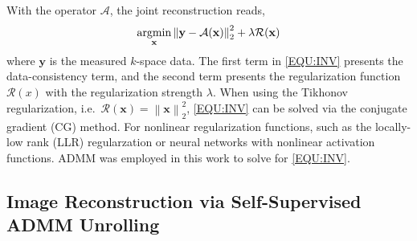 \documentclass[AMA,STIX2COL,Linenumberson]{MRM}
\newcommand{\argmin}{\operatornamewithlimits{argmin}}
\newcommand{\norm}[1]{\left\lVert#1\right\rVert}
\begin{document}
With the operator $\mathcal{A}$, the joint reconstruction reads,
\begin{equation}
    \argmin_{\mathbf{x}} \norm{\mathbf{y} - \mathcal{A}(\mathbf{x})}_2^2 + \lambda \mathcal{R}(\mathbf{x})
    \label{EQU:INV}
\end{equation}
where $\mathbf{y}$ is the measured $k$-space data.
The first term in \cref{EQU:INV} presents the data-consistency term, and
the second term presents the regularization function $\mathcal{R}(x)$
with the regularization strength $\lambda$.
When using the Tikhonov regularization,
i.e.~$\mathcal{R}(\mathbf{x}) = \norm{\mathbf{x}}_2^2$,
\cref{EQU:INV} can be solved via the conjugate gradient (CG) method.
For nonlinear regularization functions,
such as the locally-low rank (LLR) regularzation \cite{tan_2024_naviepi} or
neural networks with nonlinear activation functions.
ADMM was employed in this work to solve for \cref{EQU:INV}.

\subsection{Image Reconstruction via Self-Supervised ADMM Unrolling}
\end{document}
